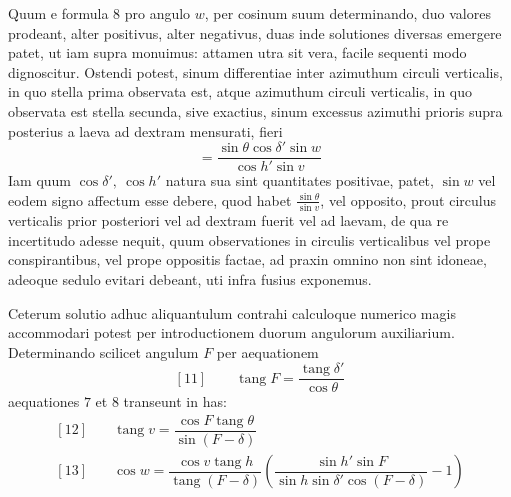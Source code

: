 Quum e formula $8$ pro angulo $w$, per cosinum suum determinando, duo valores prodeant, alter positivus, alter negativus, duas inde solutiones diversas emergere patet, ut iam supra monuimus: attamen utra sit vera, facile sequenti modo dignoscitur. Ostendi potest, sinum differentiae inter azimuthum circuli verticalis, in quo stella prima observata est, atque azimuthum circuli verticalis, in quo observata est stella secunda, sive exactius, sinum excessus azimuthi prioris supra posterius a laeva ad dextram mensurati, fieri
\[
=\frac{\sin\theta\cos\delta'\sin w}{\cos h'\sin v}
\]
Iam quum $\cos\delta',\ \cos h'$ natura sua sint quantitates positivae, patet, $\sin w$ vel eodem signo affectum esse debere, quod habet $\frac{\sin\theta}{\sin v}$, vel opposito, prout circulus verticalis prior posteriori vel ad dextram fuerit vel ad laevam, de qua re incertitudo adesse nequit, quum observationes in circulis verticalibus vel prope conspirantibus, vel prope oppositis factae, ad praxin omnino non sint idoneae, adeoque sedulo evitari debeant, uti infra fusius exponemus.

Ceterum solutio adhuc aliquantulum contrahi calculoque numerico magis accommodari potest per introductionem duorum angulorum auxiliarium. Determinando scilicet angulum $F$ per aequationem
\[
{}[11]\qquad\operatorname{tang}F=\frac{\operatorname{tang}\delta'}{\cos\theta}
\]
aequationes $7$ et $8$ transeunt in has:
\[
\begin{array}{rl}
{}[12]\quad&\operatorname{tang}v=\dfrac{\cos F\operatorname{tang}\theta}{\sin(F-\delta)}\\[5pt]
{}[13]\quad&\cos w=\dfrac{\cos v\operatorname{tang}h}{\operatorname{tang}(F-\delta)}\left(\dfrac{\sin h'\sin F}{\sin h\sin\delta'\cos(F-\delta)}-1\right)
\end{array}
\]

